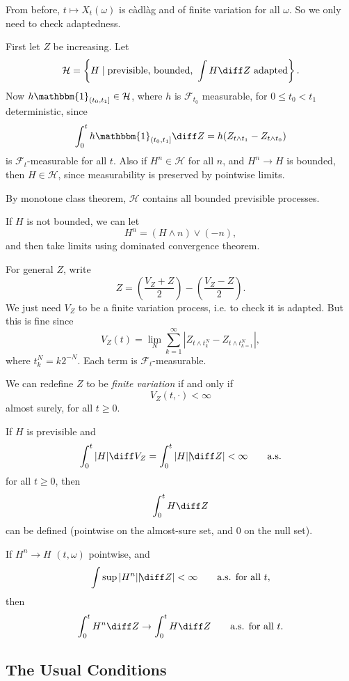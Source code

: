 \documentclass[12pt]{article}
\begin{document}
\begin{proofbox}
	From before, $t \mapsto X_t(\omega)$ is c\`adl\`ag and of finite variation for all $\omega$. So we only need to check adaptedness.

	First let $Z$ be increasing. Let
	\[
		\mathcal{H} = \left\{ H \mid \text{previsible, bounded, } \int H \diff Z \text{ adapted}\right\}.
	\]
	Now $h \mathbbm{1}_{(t_0, t_1]} \in \mathcal{H}$, where $h$ is $\mathcal{F}_{t_0}$ measurable, for $0 \leq t_0 < t_1$ deterministic, since
	\[
		\int_0^{t} h \mathbbm{1}_{(t_0, t_1]} \diff Z = h (Z_{t \wedge t_1} - Z_{t \wedge t_0})
	\]
	is $\mathcal{F}_t$-measurable for all $t$. Also if $H^{n} \in \mathcal{H}$ for all $n$, and $H^{n} \to H$ is bounded, then $H \in \mathcal{H}$, since measurability is preserved by pointwise limits.

	By monotone class theorem, $\mathcal{H}$ contains all bounded previsible processes.

	If $H$ is not bounded, we can let
	\[
	H^{n} = (H \wedge n) \vee (-n),
	\]
	and then take limits using dominated convergence theorem.

	For general $Z$, write
	\[
		Z = \left( \frac{V_Z + Z}{2} \right) - \left( \frac{V_Z - Z}{2} \right).
	\]
	We just need $V_Z$ to be a finite variation process, i.e. to check it is adapted. But this is fine since
	\[
	V_Z(t) = \lim_N \sum_{k = 1}^{\infty} |Z_{t \wedge t_k^N} - Z_{t \wedge t^{N}_{k=1}} |,
	\]
	where $t^{N}_k = k 2^{-N}$. Each term is $\mathcal{F}_t$-measurable.
\end{proofbox}


We can redefine $Z$ to be \emph{finite variation} if and only if
\[
V_Z(t, \cdot) < \infty
\]
almost surely, for all $t \geq 0$.

If $H$ is previsible and
\[
	\int_0^t |H| \diff V_Z = \int_0^t |H| |\!\diff Z| < \infty \qquad\text{a.s.}
\]
for all $t \geq 0$, then
\[
\int_0^t H \diff Z
\]
can be defined (pointwise on the almost-sure set, and $0$ on the null set).

\begin{proposition}
	If $H^{n} \to H$ $(t, \omega)$ pointwise, and
	\[
		\int \sup |H^{n}| |\!\diff Z| < \infty \qquad\text{a.s. for all }t,
	\]
	then
	\[
		\int_0^t H^{n} \diff Z \to \int_0^t H \diff Z \qquad \text{a.s. for all }t.
	\]
\end{proposition}

\subsection{The Usual Conditions}%
\label{sub:tuc}
\end{document}

